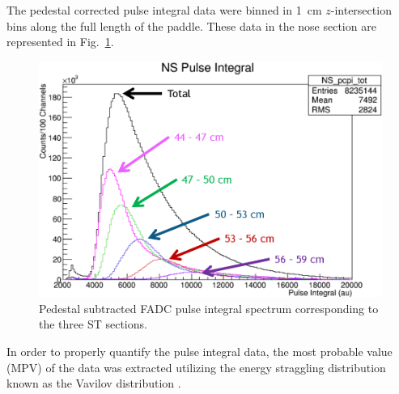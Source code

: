 The pedestal corrected pulse integral data were binned in 1~cm $z$-intersection bins along the full length of the paddle. These data in the nose section are represented in Fig.~\ref{fig:pisecnose}.
	\begin{figure}
		\centering
		\includegraphics[width=1.0\columnwidth]{calibration/figs/pi_sec_nose}
		\caption{Pedestal subtracted FADC pulse integral spectrum corresponding to the three ST sections.}
		\label{fig:pisecnose}
	\end{figure}
In order to properly quantify the pulse integral data, the most probable value (MPV) of the data was extracted utilizing the energy straggling distribution known as the Vavilov distribution \cite{vavilov_1957}.  

